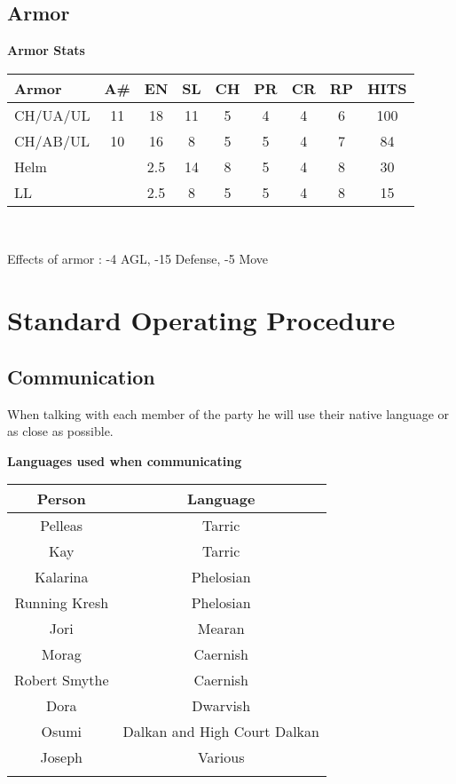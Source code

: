 \documentclass[10pt]{report}
\begin{document}
\subsection{Armor}

\begin{table}{\bf Armor Stats}\\[1ex]
         \begin{tabular}{|l|c|c|c|c|c|c|c|c|}\hline
        Armor              &A\#    &EN   &SL    &CH    &PR    &CR    &RP &HITS \\ \hline
        CH/UA/UL        &11      &18    &11     &5        &4       &4        &6      &100   \\
        CH/AB/UL        &10      &16    &8       &5        &5       &4        &7      &84    \\
        Helm                &          &2.5    &14       &8      &5       &4        &8      &30    \\ \hline
        LL               &          &2.5    &8       &5      &5       &4        &8      &15    \\ \hline
        \end{tabular} \\[0.5ex]
{}
\end{table}

Effects of armor : -4 AGL, -15 Defense, -5 Move

\section{Standard Operating Procedure}

\subsection{Communication}

When talking with each member of the party he will use their native
language or as close as possible.

\begin{table}{\bf Languages used when communicating}\\[1ex]
  \begin{tabular}{|c|c|}\hline
        Person        &  Language \\ \hline
        Pelleas       & Tarric \\
        Kay             &  Tarric \\
        Kalarina      & Phelosian \\
        Running Kresh   & Phelosian \\
        Jori              & Mearan \\
        Morag               & Caernish \\
        Robert Smythe    & Caernish \\
        Dora        & Dwarvish \\
        Osumi       & Dalkan and High Court Dalkan \\
        Joseph     & Various \\
          &      \\ \hline
  \end{tabular} \\[0.5ex]
{}
\end{table}
\end{document}
